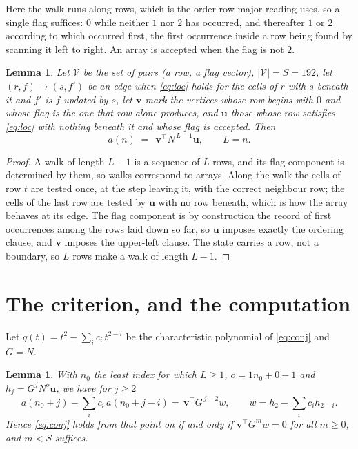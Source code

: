 \documentclass[11pt,a4paper]{article}
\theoremstyle{plain}
\newtheorem{lemma}[theorem]{Lemma}
\theoremstyle{definition}
\begin{document}
Here the walk runs along rows, which is the order row
major reading uses, so a single flag suffices: $0$ while neither $1$ nor $2$ has
occurred, and thereafter $1$ or $2$ according to which occurred first, the first occurrence
inside a row being found by scanning it left to right. An array is accepted when the flag
is not $2$.

\begin{lemma}\label{lem:walk}
Let $\mathcal V$ be the set of pairs (a row, a flag vector), $|\mathcal V|=S=192$, let
$(r,f)\to(s,f')$ be an edge when \eqref{eq:loc} holds for the cells of $r$ with $s$ beneath
it and $f'$ is $f$ updated by $s$, let $\mathbf{v}$ mark the vertices whose row begins
with $0$ and whose flag is the one that row alone produces, and $\mathbf{u}$ those whose
row satisfies \eqref{eq:loc} with nothing beneath it and whose flag is accepted. Then
\[
a(n)\;=\;\,\mathbf{v}^{\!\top}N^{\,L-1}\mathbf{u},\qquad L=n.
\]
\end{lemma}

\begin{proof}
A walk of length $L-1$ is a sequence of $L$ rows, and its flag component is determined by
them, so walks correspond to arrays. Along the walk the cells of row $t$ are tested once,
at the step leaving it, with the correct neighbour row; the cells of the last row are
tested by $\mathbf{u}$ with no row beneath, which is how the array behaves at its edge.
The flag component is by construction the record of first occurrences among the rows laid
down so far, so $\mathbf{u}$ imposes exactly the ordering clause, and $\mathbf{v}$ imposes
the upper-left clause. The state carries a row, not a boundary, so $L$ rows make a walk
of length $L-1$.
\end{proof}

\section{The criterion, and the computation}

Let $q(t)=t^{2}-\sum_i c_i\,t^{2-i}$ be the characteristic polynomial of
\eqref{eq:conj} and $G=N$.

\begin{lemma}\label{lem:crit}
With $n_0$ the least index for which $L\ge1$, $o=1n_0+0-1$ and
$h_j=G^{j}N^{o}\mathbf{u}$, we have for $j\ge2$
\[
a(n_0+j)-\sum_i c_i\,a(n_0+j-i)=\,\mathbf{v}^{\!\top}G^{\,j-2}w,
\qquad w=h_{2}-\sum_i c_ih_{2-i} .
\]
Hence \eqref{eq:conj} holds from that point on if and only if
$\mathbf{v}^{\!\top}G^{m}w=0$ for all $m\ge0$, and $m<S$ suffices.
\end{lemma}
\end{document}
